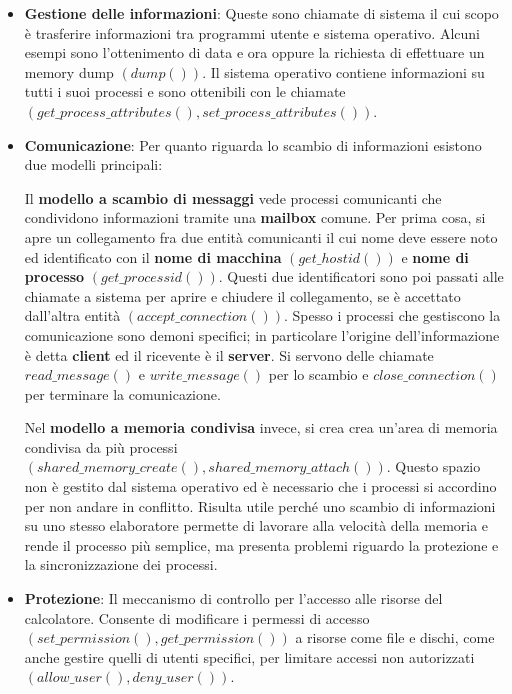 \begin{itemize}
	In caso di utenti multipli, il sistema operativo potrebbe fare una richiesta per l'uso esclusivo di un dispositivo $(request())$, per poi rilasciarlo una volta terminato l'utilizzo $(release())$. Se in ambiente UNIX, è possibile invocare le stesse chiamate a sistema utilizzate per i file, in quanto è uno dei sistemi operativi che li combina in un'unica macrostruttura. Si tratta di una scelta progettuale e non universale.
	\item \textbf{Gestione delle informazioni}: Queste sono chiamate di sistema il cui scopo è trasferire informazioni tra programmi utente e sistema operativo. Alcuni esempi sono l'ottenimento di data e ora oppure la richiesta di effettuare un memory dump $(dump())$. Il sistema operativo contiene informazioni su tutti i suoi processi e sono ottenibili con le chiamate $(get\_process\_attributes(), set\_process\_attributes())$.
	\item \textbf{Comunicazione}: Per quanto riguarda lo scambio di informazioni esistono due modelli principali:\par
	Il \textbf{modello a scambio di messaggi} vede processi comunicanti che condividono informazioni tramite una \textbf{mailbox} comune. Per prima cosa, si apre un collegamento fra due entità comunicanti il cui nome deve essere noto ed identificato con il \textbf{nome di macchina} $(get\_hostid())$ e \textbf{nome di processo} $(get\_processid())$. Questi due identificatori sono poi passati alle chiamate a sistema per aprire e chiudere il collegamento, se è accettato dall'altra entità $(accept\_connection())$. Spesso i processi che gestiscono la comunicazione sono demoni specifici; in particolare l'origine dell'informazione è detta \textbf{client} ed il ricevente è il \textbf{server}. Si servono delle chiamate $read\_message()$ e $write\_message()$ per lo scambio e $close\_connection()$ per terminare la comunicazione.\par
	Nel \textbf{modello a memoria condivisa} invece, si crea crea un'area di memoria condivisa da più processi $(shared\_memory\_create(), shared\_memory\_attach())$. Questo spazio non è gestito dal sistema operativo ed è necessario che i processi si accordino per non andare in conflitto. Risulta utile perché uno scambio di informazioni su uno stesso elaboratore permette di lavorare alla velocità della memoria e rende il processo più semplice, ma presenta problemi riguardo la protezione e la sincronizzazione dei processi.
	\item \textbf{Protezione}: Il meccanismo di controllo per l'accesso alle risorse del calcolatore. Consente di modificare i permessi di accesso $(set\_permission(), get\_permission())$ a risorse come file e dischi, come anche gestire quelli di utenti specifici, per limitare accessi non autorizzati $(allow\_user(), deny\_user())$.
\end{itemize}

